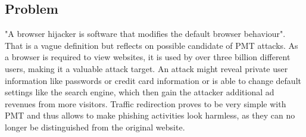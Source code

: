 \subsection{Problem}
"A browser hijacker is software that modifies the default browser behaviour"\cite{automatedspywarecollection}. That is a  vague definition but reflects on possible candidate of PMT attacks. As a browser is required to view websites, it is used by over three billion \cite{cia} different users, making it a valuable attack target. An attack might reveal private user information like passwords or credit card information or is able to change default settings like the search engine, which then gain the attacker additional ad revenues from more visitors. Traffic redirection proves to be very simple with PMT and thus allows to make phishing activities look harmless, as they can no longer be distinguished from the original website.